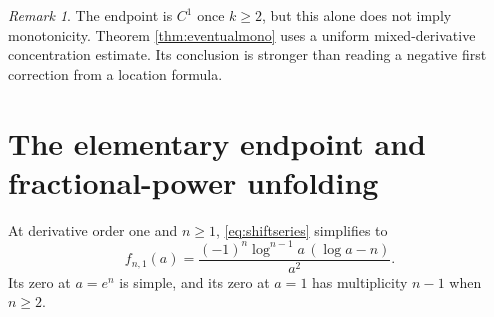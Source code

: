 \documentclass[11pt]{article}
\numberwithin{equation}{section}
\theoremstyle{definition}\newtheorem{definition}[theorem]{Definition}
\theoremstyle{remark}\newtheorem{remark}[theorem]{Remark}
\begin{document}
\begin{remark}
The endpoint is $C^1$ once $k\geq2$, but this alone does not imply monotonicity. Theorem \ref{thm:eventualmono} uses a uniform mixed-derivative concentration estimate. Its conclusion is stronger than reading a negative first correction from a location formula.
\end{remark}

\section{The elementary endpoint and fractional-power unfolding}\label{sec:smallrho}
At derivative order one and $n\geq1$, \eqref{eq:shiftseries} simplifies to
\begin{equation}\label{eq:fn1}
f_{n,1}(a)=\frac{(-1)^n\log^{n-1}a\,(\log a-n)}{a^2}.
\end{equation}
Its zero at $a=e^n$ is simple, and its zero at $a=1$ has multiplicity $n-1$ when $n\geq2$.
\end{document}
